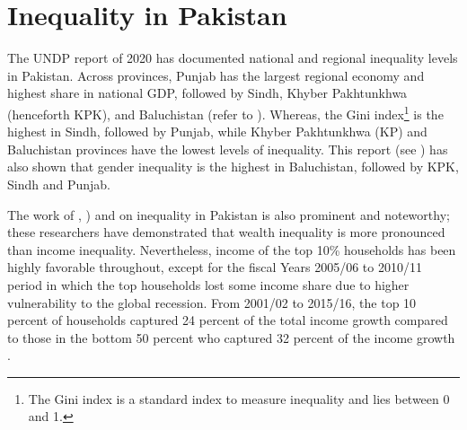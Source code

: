 \documentclass[12pt]{article}
\newcommand{\1}{\mathbbm 1}
\begin{document}
	
	






\section{Inequality in Pakistan}

	
	The UNDP report of 2020 has documented national and regional inequality levels in Pakistan. Across provinces, Punjab has the largest regional economy and highest share in national GDP, followed by Sindh, Khyber Pakhtunkhwa (henceforth KPK), and Baluchistan (refer to \cite{hafizpasha2020}). Whereas, the Gini index\footnote{The Gini index is a standard index to measure inequality and lies between 0 and 1.} is the highest in Sindh, followed by Punjab, while Khyber Pakhtunkhwa (KP) and Baluchistan provinces have the lowest levels of inequality. This report (see \cite{hafizpasha2020}) has also shown that gender inequality is the highest in Baluchistan, followed by KPK, Sindh and Punjab.
	
	 The work of \cite{burki2015multiple}, \cite{burki2020exploring}) and \cite{burki2021LUMS} on inequality in Pakistan is also prominent and noteworthy; these researchers have demonstrated that wealth inequality is more pronounced than income inequality. Nevertheless, income of the top 10\% households has been highly favorable throughout, except for the fiscal Years 2005/06 to 2010/11 period in which the top households lost some income share due to higher vulnerability to the global recession. From 2001/02 to 2015/16, the top 10 percent of households captured 24 percent of the total income growth compared to those in the bottom 50 percent who captured 32 percent of the income growth \cite{burki2021LUMS}. 
	 
\end{document}
